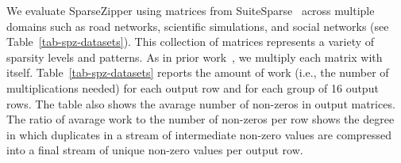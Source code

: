 We evaluate SparseZipper using matrices from
SuiteSparse~\cite{davis-suitesparse-2011} across multiple domains such as
road networks, scientific simulations, and social networks (see
Table~\ref{tab-spz-datasets}). This collection of matrices represents a
variety of sparsity levels and patterns. As in prior
work~\cite{srivastava-matraptor-micro2020, pal-outerspace-hpca2018,
  zhang-gamma-asplos2021}, we multiply each matrix with itself.
Table~\ref{tab-spz-datasets} reports the amount of work (i.e., the number
of multiplications needed) for each output row and for each group of 16
output rows. The table also shows the avarage number of non-zeros in
output matrices. The ratio of avarage work to the number of non-zeros per
row shows the degree in which duplicates in a stream of intermediate
non-zero values are compressed into a final stream of unique non-zero
values per output row.
